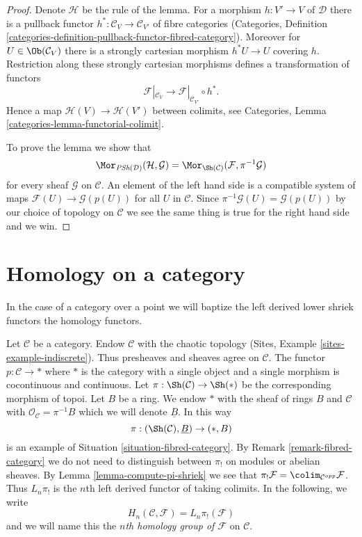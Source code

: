 \begin{proof}
Denote $\mathcal{H}$ be the rule of the lemma.
For a morphism $h : V' \to V$ of $\mathcal{D}$ there is a
pullback functor $h^* : \mathcal{C}_V \to \mathcal{C}_{V'}$ of fibre
categories (Categories, Definition
\ref{categories-definition-pullback-functor-fibred-category}).
Moreover for $U \in \Ob(\mathcal{C}_V)$ there is a
strongly cartesian morphism $h^*U \to U$ covering $h$.
Restriction along these strongly cartesian morphisms defines a
transformation of functors
$$
\mathcal{F}|_{\mathcal{C}_V}
\longrightarrow
\mathcal{F}|_{\mathcal{C}_{V'}} \circ h^*.
$$
Hence a map $\mathcal{H}(V) \to \mathcal{H}(V')$ between colimits, see
Categories, Lemma \ref{categories-lemma-functorial-colimit}.

\medskip\noindent
To prove the lemma we show that
$$
\Mor_{\textit{PSh}(\mathcal{D})}(\mathcal{H}, \mathcal{G}) =
\Mor_{\Sh(\mathcal{C})}(\mathcal{F}, \pi^{-1}\mathcal{G})
$$
for every sheaf $\mathcal{G}$ on $\mathcal{C}$. An element of the
left hand side is a compatible system of maps
$\mathcal{F}(U) \to \mathcal{G}(p(U))$ for all $U$ in $\mathcal{C}$.
Since $\pi^{-1}\mathcal{G}(U) = \mathcal{G}(p(U))$ by our choice
of topology on $\mathcal{C}$ we see the same thing is true for the
right hand side and we win.
\end{proof}





\section{Homology on a category}
\label{section-homology}

\noindent
In the case of a category over a point we will baptize the left derived
lower shriek functors the homology functors.

\begin{example}
\label{example-category-to-point}
Let $\mathcal{C}$ be a category. Endow $\mathcal{C}$ with the chaotic
topology (Sites, Example \ref{sites-example-indiscrete}). Thus
presheaves and sheaves agree on $\mathcal{C}$.
The functor $p : \mathcal{C} \to *$ where $*$ is the category with a single
object and a single morphism is cocontinuous and continuous. Let
$\pi : \Sh(\mathcal{C}) \to \Sh(*)$ be the corresponding morphism
of topoi. Let $B$ be a ring. We endow $*$ with the sheaf of rings $B$
and $\mathcal{C}$ with $\mathcal{O}_\mathcal{C} = \pi^{-1}B$ which
we will denote $\underline{B}$. In this way
$$
\pi : (\Sh(\mathcal{C}), \underline{B}) \to (*, B)
$$
is an example of Situation \ref{situation-fibred-category}.
By Remark \ref{remark-fibred-category} we do not need to distinguish
between $\pi_!$ on modules or abelian sheaves. By
Lemma \ref{lemma-compute-pi-shriek} we see that
$\pi_!\mathcal{F} = \colim_{\mathcal{C}^{opp}} \mathcal{F}$.
Thus $L_n\pi_!$ is the $n$th left derived functor of taking colimits.
In the following, we write
$$
H_n(\mathcal{C}, \mathcal{F}) = L_n\pi_!(\mathcal{F})
$$
and we will name this the {\it $n$th homology group of $\mathcal{F}$}
on $\mathcal{C}$.
\end{example}

